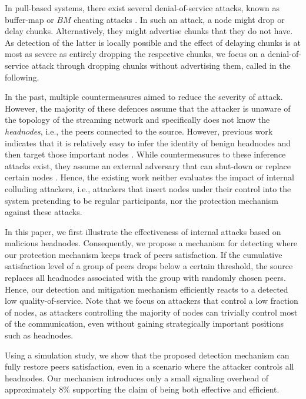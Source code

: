 In pull-based systems, there exist several denial-of-service attacks, known as buffer-map or $BM$ cheating attacks \cite{cheatingAnalysis}. 
In such an attack, a node might drop or delay chunks. Alternatively, they might advertise chunks that they do not have. As detection of the latter is locally possible and the effect of delaying chunks is at most as severe as entirely dropping the respective chunks, we focus on a denial-of-service attack through dropping chunks without advertising them, called \drop in the following.  


In the past, multiple countermeasures aimed to reduce the severity of \drop attack. However, the majority of these defences \cite{zhang2005coolstreaming, defending2, antiliar} assume that the attacker is unaware of the topology of the streaming network and specifically does not know the \emph{headnodes}, i.e., the peers connected to the source. 
However, previous work indicates that it is relatively easy to infer the identity of benign headnodes and then target those important nodes \cite{nguyen2016swap}.
While countermeasures to these inference attacks exist, they assume an external adversary that can shut-down or replace certain nodes \cite{nguyen2016swap, rbcs, nguyen2014resilience}. 
Hence, the existing work neither evaluates the impact of internal colluding attackers, i.e., attackers that insert nodes under their control into the system pretending to be regular participants, nor the protection mechanism against these attacks.


In this paper, we first illustrate the effectiveness of internal attacks based on malicious headnodes. 
Consequently, we propose a mechanism for detecting \drop where our protection mechanism keeps track of peers satisfaction. If the cumulative satisfaction level of a group of peers drops below a certain threshold, the source replaces all headnodes associated with the group with randomly chosen peers. 
Hence, our detection and mitigation mechanism efficiently reacts to a detected low quality-of-service.
Note that we focus on attackers that control a low fraction of nodes, as attackers controlling the majority of nodes can trivially control most of the communication, even without gaining strategically important positions such as headnodes.    

Using a simulation study, we show that the proposed detection mechanism can fully restore peers satisfaction, even in a scenario where the attacker controls all headnodes. 
Our mechanism introduces only a small signaling overhead of approximately $8\%$ supporting the claim of being both effective and efficient.

